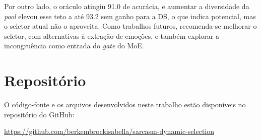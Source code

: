 \documentclass[conference]{IEEEtran}
\begin{document}
Por outro lado, o oráculo atingiu 91.0 de acurácia, e aumentar a diversidade da \textit{pool} elevou esse teto a até 93.2 sem ganho para a DS, o que indica potencial, mas o seletor atual não o aproveita. Como trabalhos futuros, recomenda-se melhorar o seletor, com alternativas à extração de emoções, e também explorar a incongruência como entrada do \textit{gate} do MoE.

\appendices
\section{Repositório}
\label{apendice}
O código-fonte e os arquivos desenvolvidos neste trabalho estão disponíveis no repositório do GitHub:

\begin{center}
\url{https://github.com/berkembrockisabella/sarcasm-dynamic-selection}
\end{center}



\end{document}
